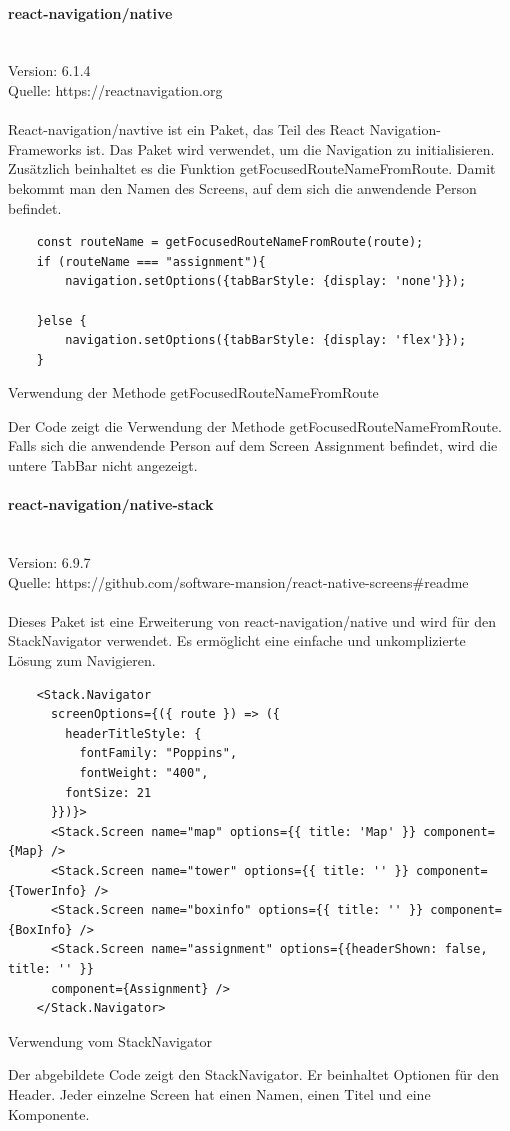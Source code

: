 \paragraph{react-navigation/native}\mbox{}\\
Version: 6.1.4\\
Quelle: https://reactnavigation.org\\ \\
React-navigation/navtive ist ein Paket, das Teil des React Navigation-\Gls{Framework}s ist. Das Paket wird verwendet, um die Navigation zu initialisieren. Zusätzlich beinhaltet es die Funktion getFocusedRouteNameFromRoute. Damit bekommt man den Namen des Screens, auf dem sich die anwendende Person befindet.\\
\begin{listing}[H]
  \begin{verbatim}
    const routeName = getFocusedRouteNameFromRoute(route);
    if (routeName === "assignment"){
        navigation.setOptions({tabBarStyle: {display: 'none'}});
        
    }else {
        navigation.setOptions({tabBarStyle: {display: 'flex'}});
    }
\end{verbatim}
  \caption{Verwendung der Methode getFocusedRouteNameFromRoute}
  \label{lst:getfocusedroutename}
\end{listing}
Der Code zeigt die Verwendung der Methode getFocusedRouteNameFromRoute. Falls sich die anwendende Person auf dem Screen Assignment befindet, wird die untere TabBar nicht angezeigt.\\


\paragraph{react-navigation/native-stack}\mbox{}\\
Version: 6.9.7\\
Quelle: https://github.com/software-mansion/react-native-screens\#readme\\ \\
Dieses Paket ist eine Erweiterung von react-navigation/native und wird für den StackNavigator verwendet. Es ermöglicht eine einfache und unkomplizierte Lösung zum Navigieren.
\begin{listing}[H]
  \begin{verbatim}
    <Stack.Navigator
      screenOptions={({ route }) => ({ 
        headerTitleStyle: {
          fontFamily: "Poppins",
          fontWeight: "400",
        fontSize: 21
      }})}>
      <Stack.Screen name="map" options={{ title: 'Map' }} component={Map} />
      <Stack.Screen name="tower" options={{ title: '' }} component={TowerInfo} />
      <Stack.Screen name="boxinfo" options={{ title: '' }} component={BoxInfo} />
      <Stack.Screen name="assignment" options={{headerShown: false, title: '' }} 
      component={Assignment} />
    </Stack.Navigator>
\end{verbatim}
  \caption{Verwendung vom StackNavigator}
  \label{lst:stacknavigator}
\end{listing}
Der abgebildete Code zeigt den StackNavigator. Er beinhaltet Optionen für den Header. Jeder einzelne Screen hat einen Namen, einen Titel und eine Komponente.\\


